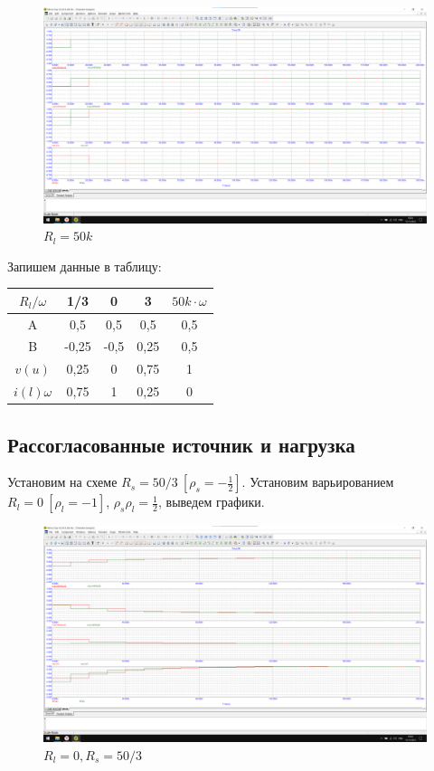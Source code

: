 \documentclass[a4paper, 12pt]{article}
\begin{document}
    \begin{figure}[H]
    \centering
    \includegraphics[width = 14 cm]{images/Graph7.png}
    \caption{$R_l = 50k$}
    \end{figure}

    Запишем данные в таблицу:

    \begin{center}
        \begin{tabular}{|c|c|c|c|c|}
        \hline 
        $R_l/\omega$ & 1/3 & 0 & 3 & $50k \cdot \omega$ \\ 
        \hline 
        A & 0,5 & 0,5 & 0,5 & 0,5 \\ 
        \hline 
        B & -0,25 & -0,5 & 0,25 & 0,5 \\ 
        \hline 
        $v(u)$ & 0,25 & 0 & 0,75 & 1 \\ 
        \hline 
        $i(l)\omega$ & 0,75 & 1 & 0,25 & 0 \\ 
        \hline 
        \end{tabular} 
    \end{center}

    \subsection*{Рассогласованные источник и нагрузка}

    Установим на схеме $R_s = 50/3 \: [\rho_s = -\frac{1}{2}]$. Установим варьированием $R_l = 0 \: [\rho_l = -1]$, $\rho_s \rho_l = \frac{1}{2}$, выведем графики.

    \begin{figure}[H]
    \centering
    \includegraphics[width = 14 cm]{images/Graph8.png}
    \caption{$R_l = 0, R_s = 50/3$}
    \end{figure}
\end{document}
